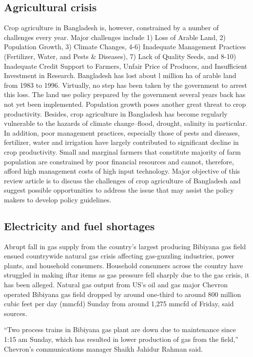 \documentclass[a4paper,12pt]{article}
\begin{document}
\subsection{Agricultural crisis}
Crop agriculture in Bangladesh is, however, constrained by a number of
challenges every year. Major challenges include 1) Loss of Arable Land, 2)
Population Growth, 3) Climate Changes, 4-6) Inadequate Management Practices
(Fertilizer, Water, and Pests & Diseases), 7) Lack of Quality Seeds, and 8-10)
Inadequate Credit Support to Farmers, Unfair Price of Produces, and Insufficient
Investment in Research. Bangladesh has lost about l million ha of arable land
from 1983 to 1996. Virtually, no step has been taken by the government to arrest
this loss. The land use policy prepared by the government several years back has
not yet been implemented. Population growth poses another great threat to crop
productivity. Besides, crop agriculture in Bangladesh has become regularly
vulnerable to the hazards of climate change–flood, drought, salinity in particular.
In addition, poor management practices, especially those of pests and diseases,
fertilizer, water and irrigation have largely contributed to significant decline in
crop productivity. Small and marginal farmers that constitute majority of farm
population are constrained by poor financial resources and cannot, therefore,
afford high management costs of high input technology.
Major objective of this review article is to discuss the challenges of crop
agriculture of Bangladesh and suggest possible opportunities to address the issue
that may assist the policy makers to develop policy guidelines. 
\subsection{Electricity and fuel shortages}

Abrupt fall in gas supply from the country’s largest producing Bibiyana gas field ensued countrywide natural gas crisis affecting gas-guzzling industries, power plants, and household consumers.
Household consumers across the country have struggled in making iftar items as gas pressure fell sharply due to the gas crisis, it has been alleged.
Natural gas output from US’s oil and gas major Chevron operated Bibiyana gas field dropped by around one-third to around 800 million cubic feet per day (mmcfd) Sunday from around 1,275 mmcfd of Friday, said sources.

“Two process trains in Bibiyana gas plant are down due to maintenance since 1:15 am Sunday, which has resulted in lower production of gas from the field,” Chevron’s communications manager Shaikh Jahidur Rahman said.
\end{document}

